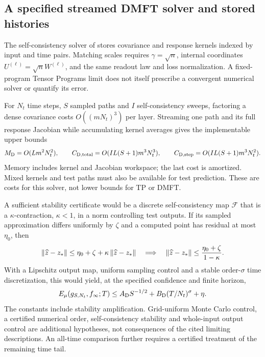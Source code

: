 \subsection{A specified streamed DMFT solver and stored histories}
\label{app:comparison-dmft}

The self-consistency solver of
\citet[Appendix~B, Algorithm~1]{bordelon2022dmft} stores covariance and
response kernels indexed by input and time pairs.  Matching scales requires
$\gamma=\sqrt n$, internal coordinates $U^{(\ell)}=\sqrt nW^{(\ell)}$,
and the same readout law and loss normalization.  A fixed-program Tensor
Programs limit \citep[Algorithm~1, Theorem~7.4]{yang2021tensor} does not
itself prescribe a convergent numerical solver or quantify its error.

For $N_t$ time steps, $S$ sampled paths and $I$ self-consistency sweeps,
factoring a dense covariance costs $O((mN_t)^3)$ per layer.  Streaming one
path and its full response Jacobian while accumulating kernel averages gives
the implementable upper bounds
\begin{equation}
 M_{\rm D}=O(Lm^2N_t^2),\qquad
 C_{\rm D,total}=O(IL(S+1)m^3N_t^3),\qquad
 C_{\rm D,step}=O(IL(S+1)m^3N_t^2).
 \label{cmp:dmft-cost}
\end{equation}
Memory includes kernel and Jacobian workspace; the last cost is amortized.
Mixed kernels and test paths must also be available for test prediction.
These are costs for this solver, not lower bounds for TP or DMFT.

A sufficient stability certificate would be a discrete self-consistency map
$\mathcal F$ that is a $\kappa$-contraction, $\kappa<1$, in a norm
controlling test outputs.  If its sampled approximation differs uniformly
by $\zeta$ and a computed point has residual at most $\eta_0$, then
\[
 \left\lVert \widehat z-z_*\right\rVert\le\eta_0+\zeta+
       \kappa\left\lVert \widehat z-z_*\right\rVert
 \quad\Longrightarrow\quad
 \left\lVert \widehat z-z_*\right\rVert\le\frac{\eta_0+\zeta}{1-\kappa}.
\]
With a Lipschitz output map, uniform sampling control and a stable
order-$\sigma$ time discretization, this would yield, at the specified
confidence and finite horizon,
\begin{equation}
 E_\mu(g_{S,N_t},f_\infty;T)
 \le A_{\rm D}S^{-1/2}+B_{\rm D}(T/N_t)^\sigma+\eta.
 \label{cmp:dmft-error}
\end{equation}
The constants include stability amplification.  Grid-uniform Monte Carlo
control, a certified numerical order, self-consistency stability and
whole-input output control are additional hypotheses, not consequences of
the cited limiting descriptions.  An all-time comparison further requires
a certified treatment of the remaining time tail.


